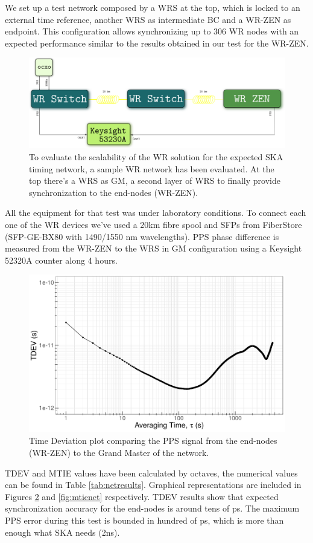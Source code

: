 We set up a test network composed by a WRS at the top, which is locked to an 
external time reference, another WRS as intermediate BC and a WR-ZEN as 
endpoint. This configuration allows synchronizing up to 306 WR nodes with an 
expected performance similar to the results obtained in our test for the WR-ZEN.

\begin{figure}
	\centering
	\includegraphics[width=0.7\linewidth]{img/prueba_red}
	\caption[WR Scalability test's setup for SKA]{To evaluate the scalability 
	of the WR solution for the expected SKA timing network, a sample WR 
	network has been evaluated. At the top there's a WRS as GM, a second layer 
	of WRS to finally provide synchronization to the end-nodes (WR-ZEN).}
	\label{fig:pruebared}
\end{figure}


All the equipment for that test was under laboratory conditions. To connect 
each one of the WR devices we've used a 20km fibre spool and SFPs from 
FiberStore (SFP-GE-BX80 with 1490/1550 nm wavelengths). PPS phase difference is 
measured from the WR-ZEN to the WRS in GM configuration using a Keysight 52320A 
counter along 4 hours.

\begin{figure}
	\centering
	\includegraphics[width=0.5\linewidth]{img/tdev_exp3}
	\caption[TDEV of the end-nodes in the scalability test.]{Time Deviation 
	plot comparing the PPS signal from the end-nodes (WR-ZEN) to the Grand 
	Master of the network.}
	\label{fig:tdevnet}
\end{figure}

TDEV and MTIE values have been calculated by octaves, the numerical 
values can 
be found in Table \ref{tab:netresults}. Graphical representations are included 
in Figures \ref{fig:tdevnet} and \ref{fig:mtienet} respectively. TDEV results 
show that expected synchronization accuracy for the end-nodes is around tens of 
ps. The maximum PPS error during this test is bounded in hundred of ps, which 
is more than enough what SKA needs (2ns).

